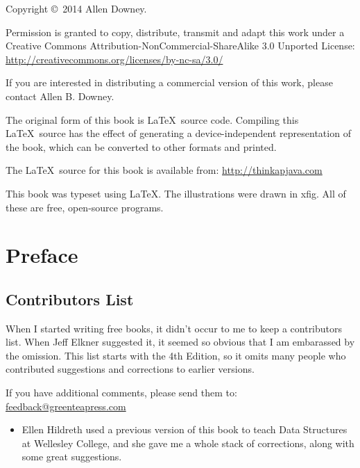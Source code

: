 \documentclass[12pt]{book}
\theoremstyle{exercise}
\begin{document}
\begin{latexonly}
Copyright \copyright ~2014 Allen Downey.

\vspace{0.25in}

Permission is granted to copy, distribute, transmit and adapt
this work under a Creative Commons
Attribution-NonCommercial-ShareAlike 3.0 Unported License:
\url{http://creativecommons.org/licenses/by-nc-sa/3.0/}

If you are interested in distributing a commercial version of this
work, please contact Allen B. Downey.

The original form of this book is \LaTeX\ source code.  Compiling this
\LaTeX\ source has the effect of generating a device-independent
representation of the book, which can be converted to other formats
and printed.

The \LaTeX\ source for this book is available from:
\url{http://thinkapjava.com}

This book was typeset using \LaTeX .  The illustrations were
drawn in xfig.  All of these are free, open-source programs.

\vspace{0.25in}



\end{latexonly}

\fi

\chapter{Preface}



\section*{Contributors List}

When I started writing free books, it didn't occur to me to keep
a contributors list.  When Jeff Elkner suggested it, it seemed so
obvious that I am embarassed by the omission.  This list starts
with the 4th Edition, so it omits many people who contributed
suggestions and corrections to earlier versions.

If you have additional comments, please send them to: \\
\href{mailto:feedback@greenteapress.com}{feedback@greenteapress.com}

\begin{itemize}

\item Ellen Hildreth used a previous version of this book to teach
  Data Structures at Wellesley College, and she gave me a whole stack
  of corrections, along with some great suggestions.


\end{itemize}
\end{document}
